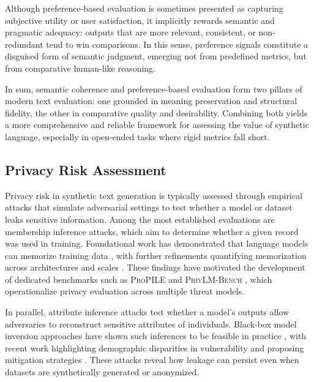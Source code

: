 Although preference-based evaluation is sometimes presented as capturing subjective utility or user satisfaction, it implicitly rewards semantic and pragmatic adequacy: outputs that are more relevant, consistent, or non-redundant tend to win comparisons. In this sense, preference signals constitute a disguised form of semantic judgment, emerging not from predefined metrics, but from comparative human-like reasoning.

In sum, semantic coherence and preference-based evaluation form two pillars of modern text evaluation: one grounded in meaning preservation and structural fidelity, the other in comparative quality and desirability. Combining both yields a more comprehensive and reliable framework for assessing the value of synthetic language, especially in open-ended tasks where rigid metrics fall short.

\subsection{Privacy Risk Assessment}

Privacy risk in synthetic text generation is typically assessed through empirical attacks that simulate adversarial settings to test whether a model or dataset leaks sensitive information. Among the most established evaluations are membership inference attacks, which aim to determine whether a given record was used in training. Foundational work has demonstrated that language models can memorize training data \citep{carlini2019secret_sharer}, with further refinements quantifying memorization across architectures and scales \citep{carlini2022quantifying_memo,schwarzschild2024rethinking_llm}. These findings have motivated the development of dedicated benchmarks such as \textsc{ProPILE} \citep{kim2023propile} and \textsc{PrivLM-Bench} \citep{li2024privlm_bench}, which operationalize privacy evaluation across multiple threat models.

In parallel, attribute inference attacks test whether a model’s outputs allow adversaries to reconstruct sensitive attributes of individuals. Black-box model inversion approaches have shown such inferences to be feasible in practice \citep{mehnaz2020blackbox_attribute_inference}, with recent work highlighting demographic disparities in vulnerability and proposing mitigation strategies \citep{kabir2025disparate_privacy}. These attacks reveal how leakage can persist even when datasets are synthetically generated or anonymized.

